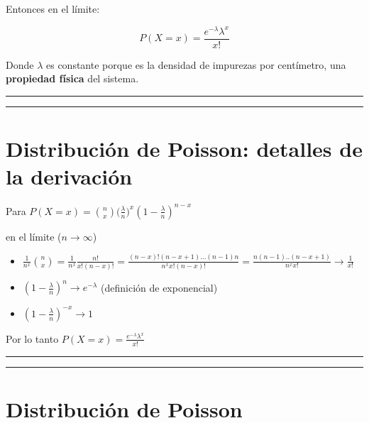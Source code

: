 \documentclass[
]{book}
\providecommand{\tightlist}{%
  \setlength{\itemsep}{0pt}\setlength{\parskip}{0pt}}
\begin{document}
Entonces en el límite:

\[P(X=x)= \frac{e^{-\lambda}\lambda^x}{x!}\]

Donde \(\lambda\) es constante porque es la densidad de impurezas por centímetro, una \textbf{propiedad física} del sistema.

\begin{center}\rule{0.5\linewidth}{0.5pt}\end{center}

\begin{center}\rule{0.5\linewidth}{0.5pt}\end{center}

\hypertarget{distribuciuxf3n-de-poisson-detalles-de-la-derivaciuxf3n}{%
\section{Distribución de Poisson: detalles de la derivación}\label{distribuciuxf3n-de-poisson-detalles-de-la-derivaciuxf3n}}

Para \(P(X=x)=\binom n x \big(\frac{\lambda}{n}\big)^x(1-\frac{\lambda}{n})^{n-x}\)

en el límite (\(n \rightarrow \infty\))

\begin{itemize}
\tightlist
\item
  \(\frac{1}{n^x}\binom n x =\frac{1}{n^x}\frac{n!}{x! (n-x)!}=\frac{(n-x)!(n-x+1)...(n-1)n}{n^x x! (n-x)!}=\frac{n(n-1)..(n-x+1)}{n^x x!} \rightarrow \frac{1}{x!}\)
\item
  \((1-\frac{\lambda}{n})^{n} \rightarrow e^{-\lambda}\) (definición de exponencial)
\item
  \((1-\frac{\lambda}{n})^{-x} \rightarrow 1\)
\end{itemize}

Por lo tanto
\(P(X=x)= \frac{e^{-\lambda}\lambda^x}{x!}\)

\begin{center}\rule{0.5\linewidth}{0.5pt}\end{center}

\begin{center}\rule{0.5\linewidth}{0.5pt}\end{center}

\hypertarget{distribuciuxf3n-de-poisson-2}{%
\section{Distribución de Poisson}\label{distribuciuxf3n-de-poisson-2}}
\end{document}
